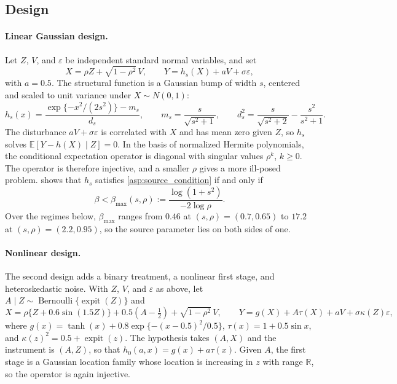 \documentclass[12pt]{article}
\theoremstyle{plain}
\theoremstyle{definition}
\theoremstyle{remark}
\begin{document}
\subsection{Design}
\label{sec:experiment_design}

\paragraph{Linear Gaussian design.}
Let $Z$, $V$, and $\varepsilon$ be independent standard normal variables, and set
\[
X=\rho Z+\sqrt{1-\rho^2}\,V,
\qquad
Y=h_s(X)+aV+\sigma\varepsilon,
\]
with $a=0.5$. The structural function is a Gaussian bump of width $s$, centered and scaled to unit variance under $X\sim N(0,1)$:
\[
h_s(x)=\frac{\exp\{-x^2/(2s^2)\}-m_s}{d_s},
\qquad
m_s=\frac{s}{\sqrt{s^2+1}},
\qquad
d_s^2=\frac{s}{\sqrt{s^2+2}}-\frac{s^2}{s^2+1}.
\]
The disturbance $aV+\sigma\varepsilon$ is correlated with $X$ and has mean zero given $Z$, so $h_s$ solves $\mathbb E[Y-h(X)\mid Z]=0$. In the basis of normalized Hermite polynomials, the conditional expectation operator is diagonal with singular values $\rho^k$, $k\geqslant0$. The operator is therefore injective, and a smaller $\rho$ gives a more ill-posed problem.  shows that $h_s$ satisfies \cref{asp:source_condition} if and only if
\[
\beta<\beta_{\max}(s,\rho):=\frac{\log(1+s^2)}{-2\log\rho}.
\]
Over the regimes below, $\beta_{\max}$ ranges from $0.46$ at $(s,\rho)=(0.7,0.65)$ to $17.2$ at $(s,\rho)=(2.2,0.95)$, so the source parameter lies on both sides of one.

\paragraph{Nonlinear design.}
The second design adds a binary treatment, a nonlinear first stage, and heteroskedastic noise. With $Z$, $V$, and $\varepsilon$ as above, let $A\mid Z\sim\operatorname{Bernoulli}\{\operatorname{expit}(Z)\}$ and
\[
X=\rho\{Z+0.6\sin(1.5Z)\}+0.5(A-\tfrac12)+\sqrt{1-\rho^2}\,V,
\qquad
Y=g(X)+A\tau(X)+aV+\sigma\kappa(Z)\varepsilon,
\]
where $g(x)=\tanh(x)+0.8\exp\{-(x-0.5)^2/0.5\}$, $\tau(x)=1+0.5\sin x$, and $\kappa(z)^2=0.5+\operatorname{expit}(z)$. The hypothesis takes $(A,X)$ and the instrument is $(A,Z)$, so that $h_0(a,x)=g(x)+a\tau(x)$. Given $A$, the first stage is a Gaussian location family whose location is increasing in $z$ with range $\mathbb R$, so the operator is again injective.
\end{document}
